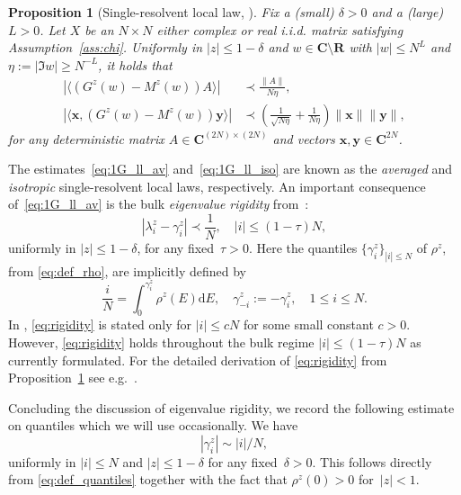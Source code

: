 \documentclass[10pt]{amsart}
\newtheorem{proposition}[theorem]{Proposition}
\numberwithin{equation}{section}
\newcommand{\dif}{\mathrm{d}}
\newcommand{\R}{\mathbf{R}}
\newcommand{\C}{\mathbf{C}}
\begin{document}
\begin{proposition}[Single-resolvent local law, {\cite[Theorem~3.1]{macroCLT_real}}]\label{prop:1G} Fix a (small) $\delta>0$ and a (large) $L>0$. Let $X$ be an $N\times N$ either complex or real i.i.d. matrix satisfying Assumption~\ref{ass:chi}. Uniformly in $|z|\le 1-\delta$ and $w\in \C\setminus\R$ with $|w|\le N^L$ and $\eta:=|\Im w|\ge N^{-L}$, it holds that 
\begin{align}
\left\vert \langle (G^z(w)-M^z(w))A\rangle\right\vert &\prec \frac{\|A\|}{N\eta},\label{eq:1G_ll_av}\\
\left\vert \langle\bm{x}, (G^z(w)-M^z(w))\bm{y}\rangle\right\vert&\prec \left(\frac{1}{\sqrt{N\eta}}+\frac{1}{N\eta}\right)\|\bm{x}\|\|\bm{y}\|,\label{eq:1G_ll_iso} 
\end{align}
for any deterministic matrix $A\in\C^{(2N)\times (2N)}$ and vectors $\bm{x},\bm{y}\in \C^{2N}$.
\end{proposition}

The estimates~\eqref{eq:1G_ll_av} and~\eqref{eq:1G_ll_iso} are known as the \emph{averaged} and \emph{isotropic} single-resolvent local laws, respectively. An important consequence of~\eqref{eq:1G_ll_av} is the bulk \emph{eigenvalue rigidity} from~\cite[Eq.(7.4)]{macroCLT_complex}:
\begin{equation}
|\lambda_i^z-\gamma_i^z|\prec \frac{1}{N},\quad |i|\le (1-\tau)N,
\label{eq:rigidity}
\end{equation}
uniformly in $|z|\le 1-\delta$, for any fixed~$\tau>0$. Here the quantiles $\{\gamma_i^z\}_{|i|\le N}$ of $\rho^z$, from \eqref{eq:def_rho}, are implicitly defined by
\begin{equation}
\frac{i}{N} =\int_0^{\gamma_i^z}\rho^z(E)\dif E,\quad \gamma_{-i}^z:=-\gamma_i^z,\quad 1\le i\le N.
\label{eq:def_quantiles}
\end{equation}
In \cite[Eq.(7.4)]{macroCLT_complex}, \eqref{eq:rigidity} is stated only for $|i|\le cN$ for some small constant $c>0$. However, \eqref{eq:rigidity} holds throughout the bulk regime $|i|\le (1-\tau)N$ as currently formulated. For the detailed derivation of \eqref{eq:rigidity} from Proposition~\ref{prop:1G} see e.g.~\cite[Section~5]{EYY12}. 

Concluding the discussion of eigenvalue rigidity, we record the following estimate on quantiles which we will use occasionally. We have
\begin{equation}
|\gamma_i^z|\sim |i|/N,
\label{eq:gamma_size}
\end{equation}
uniformly in $|i|\le N$ and $|z|\le 1-\delta$ for any fixed~$\delta>0$. This follows directly from \eqref{eq:def_quantiles} together with the fact that $\rho^z(0)>0$ for~$|z|<1$.
\end{document}
